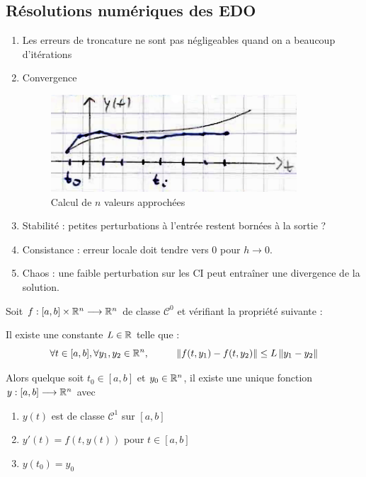 \subsection*{Résolutions numériques des EDO}
\begin{enumerate}[label=*]
    \item Les erreurs de troncature ne sont pas négligeables quand on a beaucoup d'itérations
    \item Convergence
        \begin{figure}[h]
            \centering
            \includegraphics[scale=0.5]{5-EDO-cvgence.png}
            \caption{Calcul de $n$ valeurs approchées}
        \end{figure}
    \item Stabilité : petites perturbations à l'entrée restent bornées à la sortie ?
    \item Consistance : erreur locale doit tendre vers 0 pour $h \to 0$.
    \item Chaos : une faible perturbation sur les CI peut entraîner une divergence de la solution.
\end{enumerate}

\begin{ftheo}
    Soit ${f : [a,b] \times \mathbb{R}^n \longrightarrow \mathbb{R}^n}$ de classe $\mathcal{C}^0$ et vérifiant
    la propriété suivante :

    Il existe une constante $L \in \mathbb{R}$ telle que :
        \begin{equation*}
            \forall t \in [a,b], \forall y_1, y_2 \in \mathbb{R}^n, \hspace{1cm} \left\lVert f(t,y_1) - f(t,y_2)\right\rVert \leq L \left\lVert y_1 - y_2\right\rVert
        \end{equation*}

        Alors quelque soit $t_0 \in [a,b]$ et $y_0 \in \mathbb{R}^n$, il existe une unique fonction
        ${y : [a,b] \longrightarrow \mathbb{R}^n}$ avec
    \begin{enumerate}[label=(\roman*)]
        \item $y(t)$ est de classe $\mathcal{C}^1$ sur $[a,b]$
        \item $y'(t) = f(t,y(t))$ pour $t \in [a,b]$
        \item $y(t_0) = y_0$
    \end{enumerate}
\end{ftheo}

